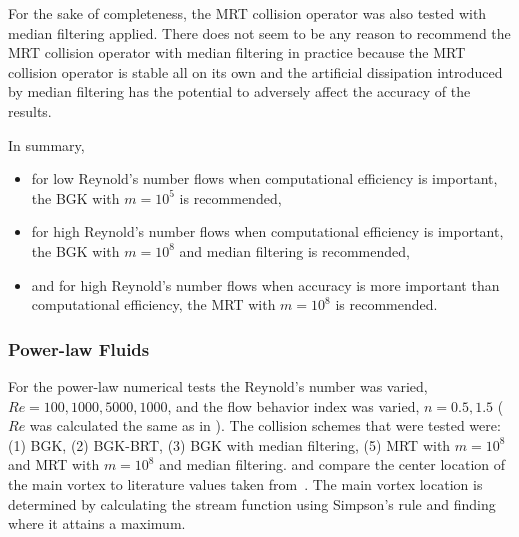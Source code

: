 \documentclass{article}
\begin{document}
For the sake of completeness, the MRT collision operator was also tested with median filtering applied.
There does not seem to be any reason to recommend the MRT collision operator with median filtering in practice because the MRT collision operator is stable all on its own and the artificial dissipation introduced by median filtering has the potential to adversely affect the accuracy of the results.

In summary, 
\begin{itemize}
    \item for low Reynold's number flows when computational efficiency is important, the BGK with $m = 10^5$ is recommended,
    \item for high Reynold's number flows when computational efficiency is important, the BGK with $m = 10^8$ and median filtering is recommended,
    \item and for high Reynold's number flows when accuracy is more important than computational efficiency, the MRT with $m = 10^8$ is recommended.
\end{itemize} 

\subsubsection{Power-law Fluids}

For the power-law numerical tests the Reynold's number was varied, $Re = 100, 1000, 5000, 1000$, and the flow behavior index was varied, $n = 0.5, 1.5$ ($Re$ was calculated the same as in ).
The collision schemes that were tested were: (1) BGK, (2) BGK-BRT, (3) BGK with median filtering, (5) MRT with $m = 10^8$ and MRT with $m = 10^8$ and median filtering.
 and  compare the center location of the main vortex to literature values taken from~\citet{li2014simulation}.
The main vortex location is determined by calculating the stream function using Simpson's rule and finding where it attains a maximum.
\end{document}
